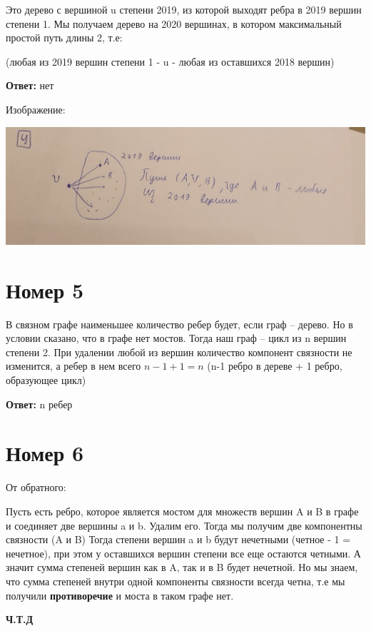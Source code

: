 \documentclass[a4paper,12pt]{article}
\begin{document}
Это дерево с вершиной u степени 2019, из которой выходят ребра в 2019 вершин степени 1. Мы получаем дерево на 2020 вершинах, в котором максимальный простой путь длины 2, т.е: 
\begin{center}
(любая из 2019 вершин степени 1 - u - любая из оставшихся 2018 вершин)
\end{center}
\begin{center}
\textbf{Ответ:} нет
\end{center}
\begin{center}
Изображение:
\end{center}
\begin{center}
\includegraphics[scale=0.4]{4.jpg}
\end{center}

\section*{Номер 5}
В связном графе наименьшее количество ребер будет, если граф -- дерево. Но в условии сказано, что в графе нет мостов. Тогда наш граф -- цикл из n вершин степени 2. При удалении любой из вершин количество компонент связности не изменится, а ребер в нем всего $n -1 + 1 = n$ (n-1 ребро в дереве + 1 ребро, образующее цикл)

\begin{center}
\textbf{Ответ:} n ребер
\end{center}
\section*{Номер 6}
От обратного:

Пусть есть ребро, которое является мостом для множеств вершин A и B в графе и соединяет две вершины a и b. Удалим его. Тогда мы получим две компонентны связности (A и B) Тогда степени вершин a и b будут нечетными (четное - 1 = нечетное), при этом у оставшихся вершин степени все еще остаются четными. А значит сумма степеней вершин как в A, так и в B будет нечетной. Но мы знаем, что сумма степеней внутри одной компоненты связности всегда четна, т.е мы получили \textbf{противоречие} и моста в таком графе нет.
\begin{center}
\textbf{Ч.Т.Д}
\end{center}
\end{document}
